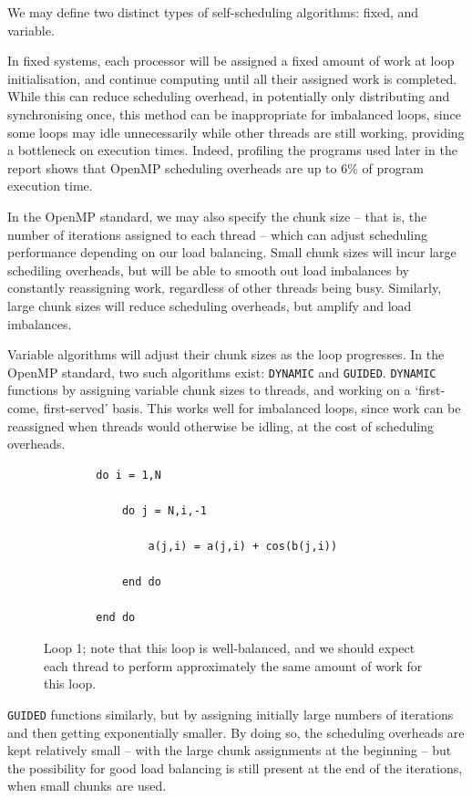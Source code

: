 \documentclass{article} %
\newcommand{\tp}{\texttt}
\begin{document}
We may define two distinct types of self-scheduling algorithms: fixed, and variable.

In fixed systems, each processor will be assigned a fixed amount of work at loop initialisation, and continue computing until all their assigned work is completed.
While this can reduce scheduling overhead, in potentially only distributing and synchronising once, this method can be inappropriate for imbalanced loops, since some loops may idle unnecessarily while other threads are still working, providing a bottleneck on execution times.
Indeed, profiling the programs used later in the report shows that OpenMP scheduling overheads are up to 6\% of program execution time.

In the OpenMP standard, we may also specify the chunk size -- that is, the number of iterations assigned to each thread -- which can adjust scheduling performance depending on our load balancing.
Small chunk sizes will incur large schediling overheads, but will be able to smooth out load imbalances by constantly reassigning work, regardless of other threads being busy.
Similarly, large chunk sizes will reduce scheduling overheads, but amplify and load imbalances.

Variable algorithms will adjust their chunk sizes as the loop progresses. 
In the OpenMP standard, two such algorithms exist: \tp{DYNAMIC} and \tp{GUIDED}.
\tp{DYNAMIC} functions by assigning variable chunk sizes to threads, and working on a `first-come, first-served' basis.
This works well for imbalanced loops, since work can be reassigned when threads would otherwise be idling, at the cost of scheduling overheads.

\begin{figure}
    \begin{lstlisting}
        do i = 1,N

            do j = N,i,-1
        
                a(j,i) = a(j,i) + cos(b(j,i))
        
            end do
      
        end do
    \end{lstlisting}
    \caption{Loop 1; note that this loop is well-balanced, and we should expect each thread to perform approximately the same amount of work for this loop.}
    \label{listing:loop1}
\end{figure}

\tp{GUIDED} functions similarly, but by assigning initially large numbers of iterations and then getting exponentially smaller.
By doing so, the scheduling overheads are kept relatively small -- with the large chunk assignments at the beginning -- but the possibility for good load balancing is still present at the end of the iterations, when small chunks are used.
\end{document}

